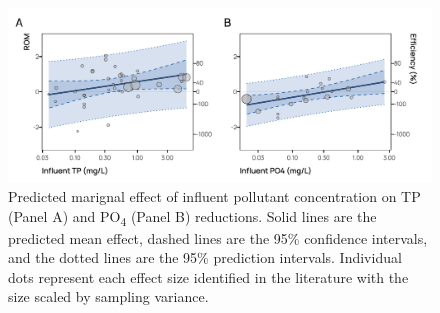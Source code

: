\documentclass[utf8]{FrontiersinHarvard}
\begin{document}
\begin{figure}[p]
\includegraphics[width=1\linewidth,]{../figures/phos_predicted} \caption{Predicted marignal effect of influent pollutant concentration on TP (Panel A) and PO\textsubscript{4} (Panel B) reductions. Solid lines are the predicted mean effect, dashed lines are the 95\% confidence intervals, and the dotted lines are the 95\% prediction intervals. Individual dots represent each effect size identified in the literature with the size scaled by sampling variance.}\label{fig:phoseffect}
\end{figure}
\end{document}
